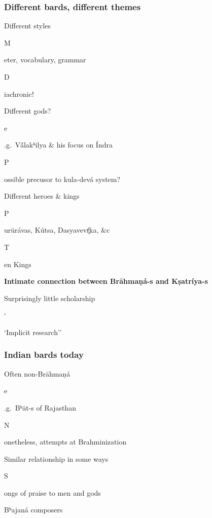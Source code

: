 \documentclass[pdf]{beamer}
\newcommand{\Subitem}[1]{{\setlength\itemindent{12pt} \item[-] #1}}
\begin{document}
\begin{frame} \frametitle{Different bards, different themes}
\begin{itemize}
	\item Different styles
	\Subitem Meter, vocabulary, grammar
	\Subitem Diachronic!
	\item Different gods?
	\Subitem e.g.~Vā́lakʰilya \& his focus on Índra
	\Subitem Possible precusor to kula-devá system?
	\item Different heroes \& kings
	\Subitem Purūrávas, Kútsa, Dasyavevŕ̥ka, \&c
	\Subitem Ten Kings
	\Subitem {\textbf{Intimate connection between Brāhmaṇá-s and Kṣatríya-s}}
	\item Surprisingly little scholarship
	\Subitem ``Implicit research''
\end{itemize}
\end{frame}

\begin{frame} \frametitle{Indian bards today}
\begin{itemize}
	\item Often non-Brāhmaṇá
	\Subitem e.g.~Bʰāt-s of Rajasthan
	\Subitem Nonetheless, attempts at Brahminization
	\item Similar relationship in some ways
	\Subitem Songs of praise to men and gods
	\item Bʰajaná composers
\end{itemize}
\end{frame}

\end{document}
